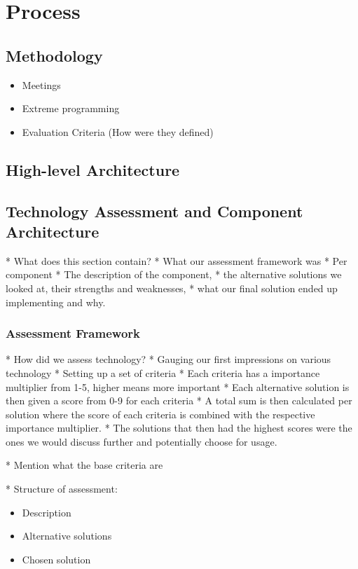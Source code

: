 \section{Process}
\subsection{Methodology}
\begin{itemize}
    \item Meetings
    \item Extreme programming
    \item Evaluation Criteria (How were they defined)
\end{itemize}

\subsection{High-level Architecture}

\subsection{Technology Assessment and Component Architecture}
* What does this section contain?
    * What our assessment framework was
    * Per component
        * The description of the component, 
        * the alternative solutions we looked at, their strengths and weaknesses, 
        * what our final solution ended up implementing and why.

\subsubsection{Assessment Framework}
* How did we assess technology?
    * Gauging our first impressions on various technology
    * Setting up a set of criteria
    * Each criteria has a importance multiplier from 1-5, higher means more important
    * Each alternative solution is then given a score from 0-9 for each criteria
    * A total sum is then calculated per solution where the score of each criteria is combined with the respective importance multiplier. 
    * The solutions that then had the highest scores were the ones we would discuss further and potentially choose for usage.

* Mention what the base criteria are

* Structure of assessment:
\begin{itemize}
    \item Description
    \item Alternative solutions
    \item Chosen solution
\end{itemize}

